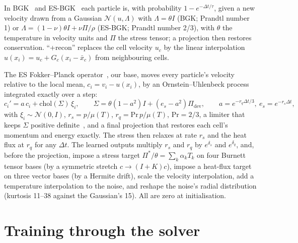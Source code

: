 \documentclass[10pt]{article}
\begin{document}
In BGK~\citep{bgk1954} and ES-BGK~\citep{holway1966} each particle is, with probability
$1-e^{-\Delta t/\tau}$, given a new velocity drawn from a Gaussian $\mathcal N(u,\Lambda)$ with
$\Lambda=\theta I$ (BGK; Prandtl number 1) or $\Lambda=(1-\nu)\theta I+\nu\Pi/\rho$ (ES-BGK;
Prandtl number 2/3), with $\theta$ the temperature in velocity units and $\Pi$ the stress
tensor; a projection then restores conservation. ``+recon'' replaces the cell velocity $u_c$ by
the linear interpolation $u(x_i)=u_c+G_c(x_i-\bar x_c)$ from neighbouring cells.

The ES Fokker--Planck operator~\citep{jenny2010,gorji2011,mathiaud2016}, our base, moves every
particle's velocity relative to the local mean, $c_i=v_i-u(x_i)$, by an Ornstein--Uhlenbeck
process integrated exactly over a step:
\begin{equation}
c_i'=a\,c_i+\mathrm{chol}(\Sigma)\,\xi_i,\qquad \Sigma=\theta(1-a^2)I+(e_s-a^2)\Pi_\mathrm{dev},
\qquad a=e^{-r_q\Delta t/3},\ e_s=e^{-r_s\Delta t},
\end{equation}
with $\xi_i\sim\mathcal N(0,I)$, $r_s=p/\mu(T)$, $r_q=\mathrm{Pr}\,p/\mu(T)$, $\mathrm{Pr}=2/3$,
a limiter that keeps $\Sigma$ positive definite~\citep{mathiaud2016}, and a final projection that
restores each cell's momentum and energy exactly. The stress then relaxes at rate $r_s$ and the
heat flux at $r_q$ for any $\Delta t$. The learned outputs multiply $r_s$ and $r_q$ by
$e^{\delta_s}$ and $e^{\delta_q}$, and, before the projection, impose a stress target
$\Pi^*/\theta=\sum_k\alpha_kT_k$ on four Burnett tensor bases (by a symmetric stretch
$c\to(I+K)c$), impose a heat-flux target on three vector bases (by a Hermite drift), scale the
velocity interpolation, add a temperature interpolation to the noise, and reshape the noise's
radial distribution (kurtosis 11--38 against the Gaussian's 15). All are zero at initialisation.

\section{Training through the solver}\label{app:ad}
\end{document}
